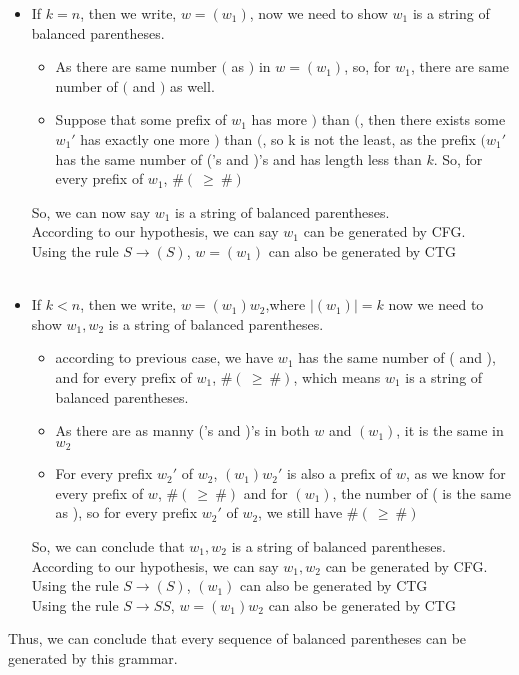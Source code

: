 \documentclass [9 pt]{article}
\theoremstyle{definition}
\begin{document}
\begin{itemize}
	\item If $k = n$, then we write, $w = (w_1)$, now we need to show $w_1$ is a string of balanced parentheses.
	\begin{itemize}
		\item As there are same number $($ as $)$ in $w = (w_1)$, so, for $w_1$, there are same number of  $($ and $)$ as well.
		\item Suppose that some prefix of $w_1$ has more $)$ than $($, then there exists some $w_1'$ has exactly one more $)$ than $($, so k is not the least, as the prefix $(w_1'$ has the same number of ('s and )'s and has length less than $k$. So, for every prefix of $w_1$, $\#(\ \geq \ \#)$
	\end{itemize}
	So, we can now say $w_1$ is a string of balanced parentheses.\\
	According to our hypothesis, we can say $w_1$ can be generated by CFG.\\
	Using the rule $ S \to (S) $, $w = (w_1)$ can also be generated by CTG\\
	\\
	\item If $k < n$, then we write, $w = (w_1)w_2$,where $|(w_1)| = k$ now we need to show $w_1, w_2$ is a string of balanced parentheses.
	\begin{itemize}
		\item according to previous case, we have $w_1$ has the same number of ( and ), and for every prefix of $w_1$, $\#(\ \geq \ \#)$, which means $w_1$ is a string of balanced parentheses.
		\item As there are as manny ('s and )'s in both $w$ and $(w_1)$, it is the same in $w_2$
		\item For every prefix $w_2'$ of $w_2$,  $(w_1)w_2'$ is also a prefix of $w$, as we know for every prefix of $w$, $\#(\  \geq \ \#)$ and for $(w_1)$, the number of ( is the same as ), so for every prefix $w_2'$ of $w_2$, we still have $\#(\  \geq \ \#)$
	\end{itemize}
	So, we can conclude that $w_1, w_2$ is a string of balanced parentheses.
	According to our hypothesis, we can say $w_1, w_2$ can be generated by CFG.\\
	Using the rule $ S \to (S) $, $(w_1)$ can also be generated by CTG\\
	Using the rule $ S \to SS $, $w = (w_1)w_2 $ can also be generated by CTG\\

\end{itemize}
Thus, we can conclude that  every sequence of balanced parentheses can be generated by this grammar.\\
\end{document}
